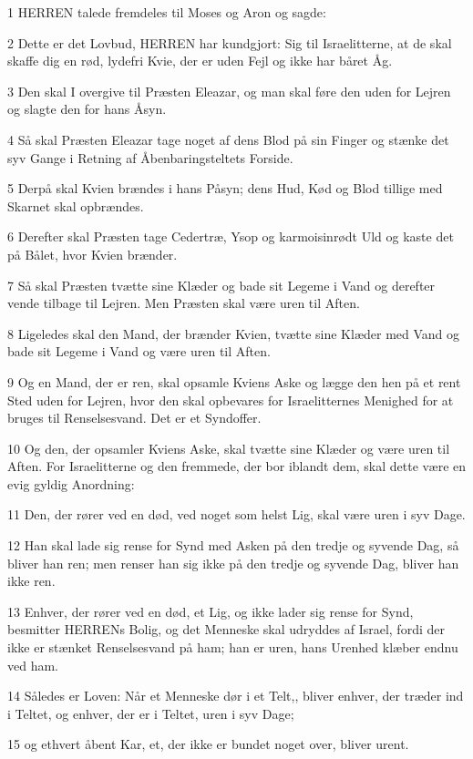 \par 1 HERREN talede fremdeles til Moses og Aron og sagde:
\par 2 Dette er det Lovbud, HERREN har kundgjort: Sig til Israelitterne, at de skal skaffe dig en rød, lydefri Kvie, der er uden Fejl og ikke har båret Åg.
\par 3 Den skal I overgive til Præsten Eleazar, og man skal føre den uden for Lejren og slagte den for hans Åsyn.
\par 4 Så skal Præsten Eleazar tage noget af dens Blod på sin Finger og stænke det syv Gange i Retning af Åbenbaringsteltets Forside.
\par 5 Derpå skal Kvien brændes i hans Påsyn; dens Hud, Kød og Blod tillige med Skarnet skal opbrændes.
\par 6 Derefter skal Præsten tage Cedertræ, Ysop og karmoisinrødt Uld og kaste det på Bålet, hvor Kvien brænder.
\par 7 Så skal Præsten tvætte sine Klæder og bade sit Legeme i Vand og derefter vende tilbage til Lejren. Men Præsten skal være uren til Aften.
\par 8 Ligeledes skal den Mand, der brænder Kvien, tvætte sine Klæder med Vand og bade sit Legeme i Vand og være uren til Aften.
\par 9 Og en Mand, der er ren, skal opsamle Kviens Aske og lægge den hen på et rent Sted uden for Lejren, hvor den skal opbevares for Israelitternes Menighed for at bruges til Renselsesvand. Det er et Syndoffer.
\par 10 Og den, der opsamler Kviens Aske, skal tvætte sine Klæder og være uren til Aften. For Israelitterne og den fremmede, der bor iblandt dem, skal dette være en evig gyldig Anordning:
\par 11 Den, der rører ved en død, ved noget som helst Lig, skal være uren i syv Dage.
\par 12 Han skal lade sig rense for Synd med Asken på den tredje og syvende Dag, så bliver han ren; men renser han sig ikke på den tredje og syvende Dag, bliver han ikke ren.
\par 13 Enhver, der rører ved en død, et Lig, og ikke lader sig rense for Synd, besmitter HERRENs Bolig, og det Menneske skal udryddes af Israel, fordi der ikke er stænket Renselsesvand på ham; han er uren, hans Urenhed klæber endnu ved ham.
\par 14 Således er Loven: Når et Menneske dør i et Telt,, bliver enhver, der træder ind i Teltet, og enhver, der er i Teltet, uren i syv Dage;
\par 15 og ethvert åbent Kar, et, der ikke er bundet noget over, bliver urent.

